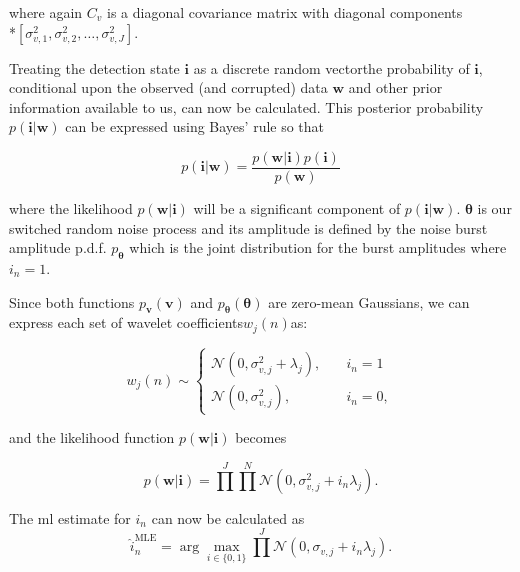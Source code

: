 where again $C_v$ is a diagonal covariance matrix with diagonal components \\*$[\sigma_{v,1}^2, \sigma_{v,2}^2, \ldots, \sigma_{v,J}^2]$.

Treating the detection state $\boldsymbol{i}$ as a discrete random vector\DIFaddbegin \DIFadd{, }\DIFaddend the probability of $\boldsymbol{i}$, conditional upon the observed (and corrupted) data $\boldsymbol{w}$ and other prior information available to us, can now be calculated. This posterior probability $p(\boldsymbol{i}|\boldsymbol{w})$ can be expressed using Bayes' rule so that

\begin{equation}\label{eq:Bayes}
p(\boldsymbol{i}|\boldsymbol{w}) = \frac{p(\boldsymbol{w}|\boldsymbol{i})p(\boldsymbol{i})}{p(\boldsymbol{w})}
\end{equation}

where the likelihood $p(\boldsymbol{w}|\boldsymbol{i})$ will be a significant component of $p(\boldsymbol{i}|\boldsymbol{w})$.
$\boldsymbol{\theta}$ is our switched random noise process and its amplitude is defined by the noise burst amplitude p.d.f. $p_{\boldsymbol{\theta}}$ which is the joint distribution for the burst amplitudes where $i_{n} = 1$.

Since both functions $p_{\boldsymbol{v}}(\boldsymbol{v})$ and $p_{\boldsymbol{\theta}}(\boldsymbol{\theta})$ are zero-mean Gaussians, we can express each set of wavelet coefficients\DIFdelbegin {}\DIFdelend \DIFaddbegin \DIFadd{, }\DIFaddend $w_j(n)$\DIFaddbegin \DIFadd{, }\DIFaddend as:

\begin{equation}\label{eq:cases}
  w_j(n) \sim
  \begin{cases}
    \mathcal{N}(0,\sigma_{v,j}^2 + \lambda_j), & \quad i_n = 1\\
   \mathcal{N}(0,\sigma_{v,j}^2), & \quad i_n = 0,
  \end{cases}
\end{equation}

and the likelihood function $p(\boldsymbol{w}|\boldsymbol{i})$ becomes

\begin{equation}\label{eq:likelihood1}
p(\boldsymbol{w}|\boldsymbol{i}) = \prod^J \prod^N \mathcal{N}(0,\sigma_{v,j}^2 + i_n\lambda_j).
\end{equation}

The \DIFdelbegin {}\DIFdelend \DIFaddbegin \gls{ml} \DIFaddend estimate for $i_n$ can now \DIFdelbegin {}\DIFdelend be calculated as
\begin{equation}\label{eq:ml1}
\hat{i}_n^{\textrm{MLE}} = \arg\max_{i\in\{0,1\}} \prod^J \mathcal{N}(0,\sigma_{v,j} + i_n\lambda_j).
\end{equation}

